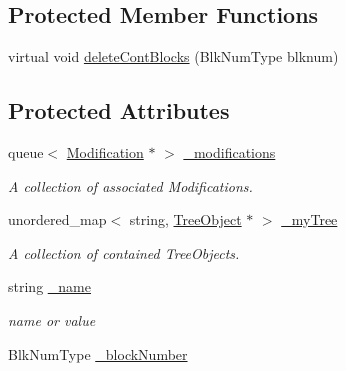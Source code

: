 \subsection*{Protected Member Functions}
\begin{DoxyCompactItemize}
\item 
virtual void \mbox{\hyperlink{classTreeObject_a74c73604c877bec03f6188147af7c509}{delete\+Cont\+Blocks}} (Blk\+Num\+Type blknum)
\end{DoxyCompactItemize}
\subsection*{Protected Attributes}
\begin{DoxyCompactItemize}
\item 
\mbox{\label{classTreeObject_ac285793f5d7cba8069670210606c66c7}} 
queue$<$ \mbox{\hyperlink{classModification}{Modification}} $\ast$ $>$ \mbox{\hyperlink{classTreeObject_ac285793f5d7cba8069670210606c66c7}{\+\_\+modifications}}
\begin{DoxyCompactList}\small\item\em A collection of associated Modifications. \end{DoxyCompactList}\item 
\mbox{\label{classTreeObject_a59effca19a3475c84496c7f82c856d38}} 
unordered\+\_\+map$<$ string, \mbox{\hyperlink{classTreeObject}{Tree\+Object}} $\ast$ $>$ \mbox{\hyperlink{classTreeObject_a59effca19a3475c84496c7f82c856d38}{\+\_\+my\+Tree}}
\begin{DoxyCompactList}\small\item\em A collection of contained Tree\+Objects. \end{DoxyCompactList}\item 
\mbox{\label{classTreeObject_a368b410ed9b21c7106babf2ba93399b3}} 
string \mbox{\hyperlink{classTreeObject_a368b410ed9b21c7106babf2ba93399b3}{\+\_\+name}}
\begin{DoxyCompactList}\small\item\em name or value \end{DoxyCompactList}\item 
\mbox{\label{classTreeObject_a17cfa5bde700978b4ec326909362bd2c}} 
Blk\+Num\+Type \mbox{\hyperlink{classTreeObject_a17cfa5bde700978b4ec326909362bd2c}{\+\_\+block\+Number}}

\end{DoxyCompactItemize}
